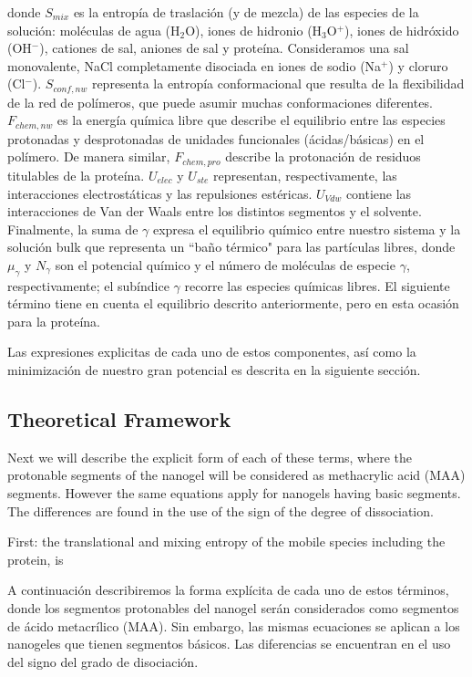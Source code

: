 \noindent donde $S_{mix}$ es la entrop\'ia de traslaci\'on (y de mezcla) de las especies de la soluci\'on: mol\'eculas de agua (H$_2$O), iones de hidronio (H$_3$O$^+$), iones de hidr\'oxido (OH$^- $), cationes de sal, aniones de sal y prote\'ina.
Consideramos una sal monovalente, NaCl completamente disociada en iones de sodio (Na$^+$) y cloruro (Cl$^-$).
$S_{conf,nw}$ representa la entrop\'ia conformacional que resulta de la flexibilidad de la red de pol\'imeros, que puede asumir muchas conformaciones diferentes.
$F_{chem,nw}$ es la energ\'ia qu\'imica libre que describe el equilibrio entre las especies protonadas y desprotonadas de unidades funcionales (\'acidas/b\'asicas) en el pol\'imero.
De manera similar, $F_{chem,pro}$ describe la protonaci\'on de residuos titulables de la prote\'ina.
$U_{elec}$ y $U_{ste}$ representan, respectivamente, las interacciones electrost\'aticas y las repulsiones est\'ericas.
$U_{Vdw}$ contiene las interacciones de Van der Waals entre los distintos segmentos y el solvente.
Finalmente, la suma de $\gamma$ expresa el equilibrio qu\'imico entre nuestro sistema y la soluci\'on bulk que representa un ``ba\~no t\'ermico" para las part\'iculas libres, donde $\mu_\gamma$ y $N_\gamma$ son el potencial qu\'imico y el n\'umero de mol\'eculas de especie $\gamma$, respectivamente;
el sub\'indice $\gamma$ recorre las especies qu\'imicas libres.
El siguiente t\'ermino tiene en cuenta el equilibrio descrito anteriormente, pero en esta ocasi\'on para la prote\'ina.

Las expresiones explicitas de cada uno de estos componentes, as\'i como la minimizaci\'on de nuestro gran potencial es descrita en la siguiente secci\'on.



\subsection{Theoretical Framework}\label{sect:theory}

Next we will describe the explicit form of each of these terms, where the protonable segments of the nanogel will be considered as methacrylic acid (MAA) segments. However the same equations apply for nanogels having  basic segments. The differences are found in the use of the sign of the degree of dissociation.

First:  the translational and mixing entropy of the mobile species including the protein, is

A continuaci\'on describiremos la forma expl\'icita de cada uno de estos t\'erminos, donde los segmentos protonables del nanogel ser\'an considerados como segmentos de \'acido metacrílico (MAA). Sin embargo, las mismas ecuaciones se aplican a los nanogeles que tienen segmentos b\'asicos. Las diferencias se encuentran en el uso del signo del grado de disociaci\'on.

